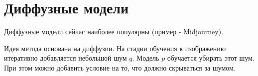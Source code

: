 \section{Диффузные модели}

\begin{remark}
    Диффузные модели сейчас наиболее популярны (пример - Midjourney).
\end{remark}

Идея метода основана на диффузии. На стадии обучения к изображению итеративно добавляется небольшой шум $q$. Модель $p$ обучается убирать этот шум. При этом можно добавить условие на то, что должно скрываться за шумом.
